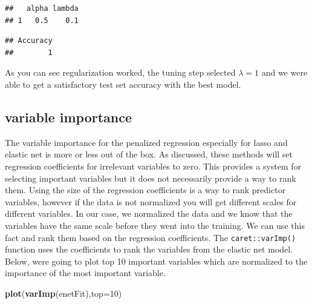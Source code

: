 \documentclass[12pt,]{krantz}
\newenvironment{Shaded}{\begin{snugshade}}{\end{snugshade}}
\newcommand{\CommentTok}[1]{\textcolor[rgb]{0.56,0.35,0.01}{\textit{#1}}}
\newcommand{\DataTypeTok}[1]{\textcolor[rgb]{0.13,0.29,0.53}{#1}}
\newcommand{\DecValTok}[1]{\textcolor[rgb]{0.00,0.00,0.81}{#1}}
\newcommand{\KeywordTok}[1]{\textcolor[rgb]{0.13,0.29,0.53}{\textbf{#1}}}
\newcommand{\NormalTok}[1]{#1}
\newcommand{\OperatorTok}[1]{\textcolor[rgb]{0.81,0.36,0.00}{\textbf{#1}}}
\begin{document}
\begin{verbatim}
##   alpha lambda
## 1   0.5    0.1
\end{verbatim}

\begin{Shaded}
\end{Shaded}

\begin{verbatim}
## Accuracy 
##        1
\end{verbatim}

As you can see regularization worked, the tuning step selected \(\lambda=1\) and we were able to get a satisfactory test set accuracy with the best model.

\hypertarget{variable-importance-2}{%
\subsection{variable importance}\label{variable-importance-2}}

The variable importance for the penalized regression especially for lasso and elastic net is more or less out of the box. As discussed, these methods will set regression coefficients for irrelevant variables to zero. This provides a system for selecting important variables but it does not necessarily provide a way to rank them. Using the size of the regression coefficients is a way to rank predictor variables, however if the data is not normalized you will get different scales for different variables. In our case, we normalized the data and we know that the variables have the same scale before they went into the training. We can use this fact and rank them based on the regression coefficients. The \texttt{caret::varImp()} function uses the coefficients to rank the variables from the elastic net model. Below, were going to plot top 10 important variables which are normalized to the importance of the most important variable.

\begin{Shaded}
\begin{Highlighting}[]
\KeywordTok{plot}\NormalTok{(}\KeywordTok{varImp}\NormalTok{(enetFit),}\DataTypeTok{top=}\DecValTok{10}\NormalTok{)}
\end{Highlighting}
\end{Shaded}
\end{document}

